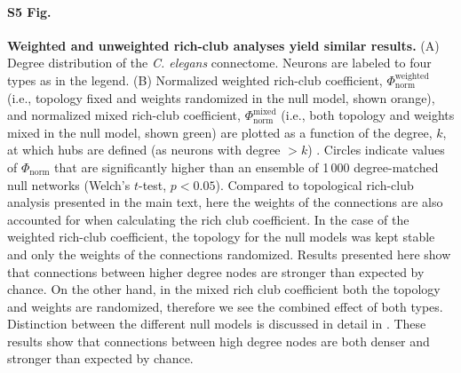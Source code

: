 \documentclass[10pt,letterpaper]{article}
\begin{document}
\paragraph*{S5 Fig.}
\label{S5_Fig}
{\bf Weighted and unweighted rich-club analyses yield similar results.}
   (A) Degree distribution of the \emph{C. elegans} connectome.
    Neurons are labeled to four types as in the legend.
    (B)
    Normalized weighted rich-club coefficient, $\Phi_\mathrm{norm}^\mathrm{weighted}$ (i.e., topology fixed and weights randomized in the null model, shown orange), and
    normalized mixed rich-club coefficient, $\Phi_\mathrm{norm}^\mathrm{mixed}$ (i.e., both topology and weights mixed in the null model, shown green) are plotted as a function of the degree, $k$, at which hubs are defined (as neurons with degree $>k$) \cite{Alstott2014}.
    Circles indicate values of $\Phi_\mathrm{norm}$ that are significantly higher than an ensemble of 1\,000 degree-matched null networks (Welch's $t$-test, $p < 0.05$).
    Compared to topological rich-club analysis presented in the main text, here the weights of the connections are also accounted for when calculating the rich club coefficient.
    In the case of the weighted rich-club coefficient, the topology for the null models was kept stable and only the weights of the connections randomized. Results presented here show that connections between higher degree nodes are stronger than expected by chance.
    On the other hand, in the mixed rich club coefficient both the topology and weights are randomized, therefore we see the combined effect of both types.
    Distinction between the different null models is discussed in detail in \cite{Alstott2014}.
    These results show that connections between high degree nodes are both denser and stronger than expected by chance.
\end{document}
